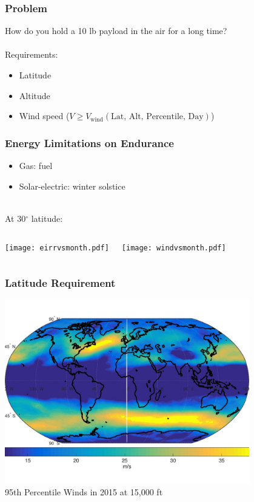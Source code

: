 \documentclass{beamer}
\begin{document}
\begin{frame}
    \frametitle{Problem}

    How do you hold a 10 lb payload in the air for a long time? \\~\\
    \pause
    Requirements:
    \begin{itemize}
        \pause
        \item Latitude
        \pause
        \item Altitude 
        \pause
        \item Wind speed ($V \geq V_{\text{wind}}(\text{Lat, Alt, Percentile, Day})$)
    \end{itemize}

\end{frame}
 
\begin{frame}
    \frametitle{Energy Limitations on Endurance}

    \pause
    \begin{itemize}
        \item Gas: fuel 
            \pause
        \item Solar-electric: winter solstice \\~\\
    \end{itemize}

    \pause
    At 30$^{\circ}$ latitude:
    \begin{columns}
        \texttt{[image: eirrvsmonth.pdf]}
        
        \pause
        \texttt{[image: windvsmonth.pdf]}
    \end{columns}

\end{frame}

\begin{frame}
    \frametitle{Latitude Requirement}
    
    \begin{center}
        \includegraphics[width=0.8\textwidth]{worldwinds.jpg} \\
        \scriptsize
        95th Percentile Winds in 2015 at 15,000 ft 
    \end{center}
    

\end{frame}
\end{document}
